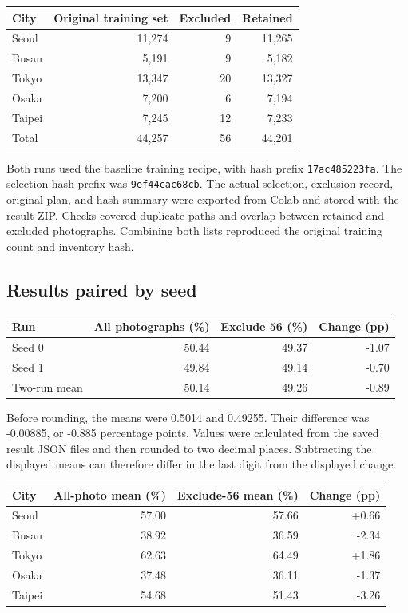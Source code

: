 \documentclass[11pt]{article}
\begin{document}
\begin{center}\small
\begin{tabular}{lrrr}
\toprule
City & Original training set & Excluded & Retained \\
\midrule
Seoul & 11,274 & 9 & 11,265 \\
Busan & 5,191 & 9 & 5,182 \\
Tokyo & 13,347 & 20 & 13,327 \\
Osaka & 7,200 & 6 & 7,194 \\
Taipei & 7,245 & 12 & 7,233 \\
\midrule
Total & 44,257 & 56 & 44,201 \\
\bottomrule
\end{tabular}
\end{center}

Both runs used the baseline training recipe, with hash prefix
\texttt{17ac485223fa}. The selection hash prefix was \texttt{9ef44cac68cb}.
The actual selection, exclusion record, original plan, and hash summary were
exported from Colab and stored with the result ZIP. Checks covered duplicate
paths and overlap between retained and excluded photographs. Combining both
lists reproduced the original training count and inventory hash.

\subsection{Results paired by seed}

\begin{center}\small
\begin{tabular}{lrrr}
\toprule
Run & All photographs (\%) & Exclude 56 (\%) & Change (pp) \\
\midrule
Seed 0 & 50.44 & 49.37 & -1.07 \\
Seed 1 & 49.84 & 49.14 & -0.70 \\
\midrule
Two-run mean & 50.14 & 49.26 & -0.89 \\
\bottomrule
\end{tabular}
\end{center}

Before rounding, the means were 0.5014 and 0.49255. Their difference was
-0.00885, or -0.885 percentage points. Values were calculated from the saved
result JSON files and then rounded to two decimal places. Subtracting the
displayed means can therefore differ in the last digit from the displayed
change.

\begin{center}\small
\begin{tabular}{lrrr}
\toprule
City & All-photo mean (\%) & Exclude-56 mean (\%) & Change (pp) \\
\midrule
Seoul & 57.00 & 57.66 & +0.66 \\
Busan & 38.92 & 36.59 & -2.34 \\
Tokyo & 62.63 & 64.49 & +1.86 \\
Osaka & 37.48 & 36.11 & -1.37 \\
Taipei & 54.68 & 51.43 & -3.26 \\
\bottomrule
\end{tabular}
\end{center}
\end{document}
